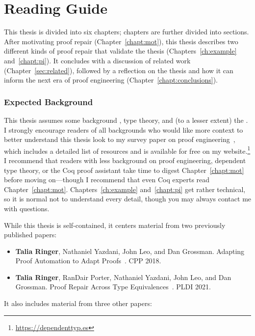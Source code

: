 \section{Reading Guide}


This thesis is divided into six chapters; chapters are further divided into sections.
After motivating proof repair (Chapter~\ref{chapt:mot}),
this thesis describes two different kinds of proof repair that validate the thesis (Chapters~\ref{ch:example} and~\ref{chapt:pi}).
It concludes with a discussion of related work (Chapter~\ref{sec:related}),
followed by a reflection on the thesis and how it can inform the next era of 
proof engineering (Chapter~\ref{chapt:conclusions}).

\subsubsection*{Expected Background}

This thesis assumes some background , type theory, and (to a lesser extent) the  . 
I strongly encourage readers of all backgrounds who would like more context to better understand this thesis
look to my survey paper on proof engineering~\cite{PGL-045}, which includes a detailed list of resources
and is available for free on my website.\footnote{\url{https://dependenttyp.es}}
I recommend that readers with less background on proof engineering, dependent type theory, or the Coq proof assistant
take time to digest Chapter~\ref{chapt:mot} before moving on---though I recommend that even Coq experts read Chapter~\ref{chapt:mot}.
Chapters~\ref{ch:example} and~\ref{chapt:pi} get rather technical, so it is normal not to understand every detail,
though you may always contact me with questions.

While this thesis is self-contained, it centers material from two previously published papers:

\begin{itemize}
\item \textbf{Talia Ringer}, Nathaniel Yazdani, John Leo, and Dan Grossman. Adapting Proof Automation to Adapt Proofs~\cite{ringer2018adapting}. CPP 2018.
\item \textbf{Talia Ringer}, RanDair Porter, Nathaniel Yazdani, John Leo, and Dan Grossman. Proof Repair Across Type Equivalences~\cite{Ringer2021}. PLDI 2021.
\end{itemize}
It also includes material from three other papers:

